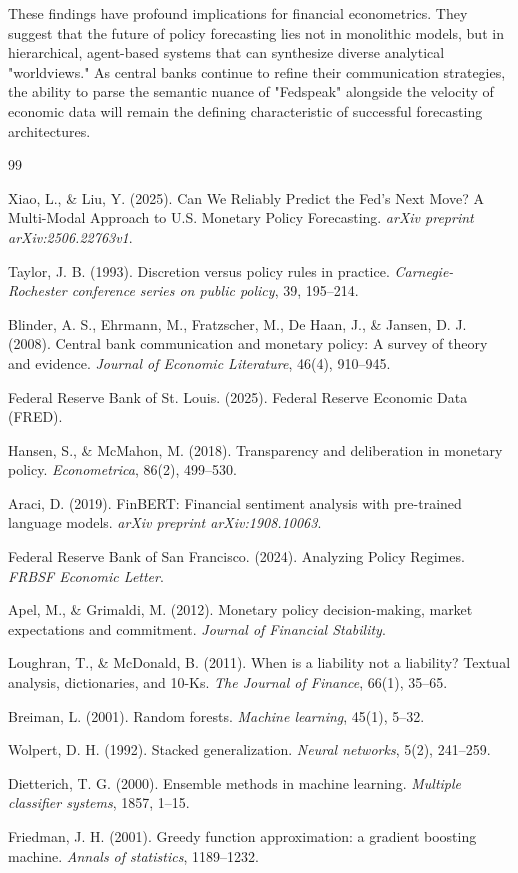 \documentclass[11pt, a4paper]{article}
\begin{document}
These findings have profound implications for financial econometrics. They suggest that the future of policy forecasting lies not in monolithic models, but in hierarchical, agent-based systems that can synthesize diverse analytical "worldviews." As central banks continue to refine their communication strategies, the ability to parse the semantic nuance of "Fedspeak" alongside the velocity of economic data will remain the defining characteristic of successful forecasting architectures.

\begin{thebibliography}{99}

Xiao, L., \& Liu, Y. (2025). Can We Reliably Predict the Fed's Next Move? A Multi-Modal Approach to U.S. Monetary Policy Forecasting. \textit{arXiv preprint arXiv:2506.22763v1}.

Taylor, J. B. (1993). Discretion versus policy rules in practice. \textit{Carnegie-Rochester conference series on public policy}, 39, 195--214.

Blinder, A. S., Ehrmann, M., Fratzscher, M., De Haan, J., \& Jansen, D. J. (2008). Central bank communication and monetary policy: A survey of theory and evidence. \textit{Journal of Economic Literature}, 46(4), 910--945.

Federal Reserve Bank of St. Louis. (2025). Federal Reserve Economic Data (FRED).

Hansen, S., \& McMahon, M. (2018). Transparency and deliberation in monetary policy. \textit{Econometrica}, 86(2), 499--530.

Araci, D. (2019). FinBERT: Financial sentiment analysis with pre-trained language models. \textit{arXiv preprint arXiv:1908.10063}.

Federal Reserve Bank of San Francisco. (2024). Analyzing Policy Regimes. \textit{FRBSF Economic Letter}.

Apel, M., \& Grimaldi, M. (2012). Monetary policy decision-making, market expectations and commitment. \textit{Journal of Financial Stability}.

Loughran, T., \& McDonald, B. (2011). When is a liability not a liability? Textual analysis, dictionaries, and 10-Ks. \textit{The Journal of Finance}, 66(1), 35--65.

Breiman, L. (2001). Random forests. \textit{Machine learning}, 45(1), 5--32.

Wolpert, D. H. (1992). Stacked generalization. \textit{Neural networks}, 5(2), 241--259.

Dietterich, T. G. (2000). Ensemble methods in machine learning. \textit{Multiple classifier systems}, 1857, 1--15.

Friedman, J. H. (2001). Greedy function approximation: a gradient boosting machine. \textit{Annals of statistics}, 1189--1232.

\end{thebibliography}
\end{document}
